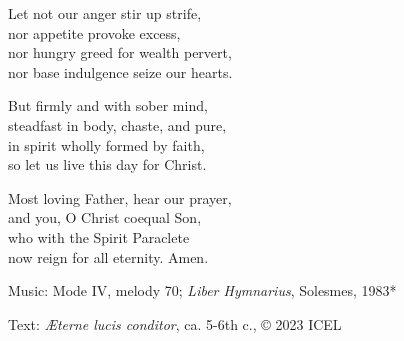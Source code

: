 \hymn



\begin{underhymnverse}
  Let not our anger stir up strife,\\
  nor appetite provoke excess,\\
  nor hungry greed for wealth pervert,\\
  nor base indulgence seize our hearts.

  But firmly and with sober mind,\\
  steadfast in body, chaste, and pure,\\
  in spirit wholly formed by faith,\\
  so let us live this day for Christ.

  Most loving Father, hear our prayer,\\
  and you, O Christ coequal Son,\\
  who with the Spirit Paraclete\\
  now reign for all eternity. Amen.
      \end{underhymnverse}

\begin{hymnsource}
Music: Mode IV, melody 70; \emph{Liber Hymnarius}, Solesmes, 1983*

Text: \emph{Æterne lucis conditor}, ca. 5-6th c., © 2023 ICEL
\end{hymnsource}
